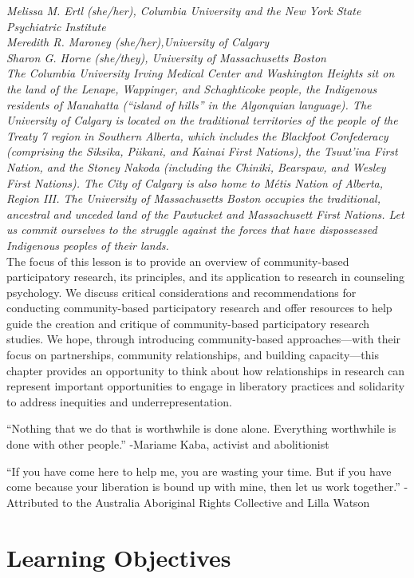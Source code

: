 \documentclass[
  11pt,
]{book}
\begin{document}
\emph{Melissa M. Ertl (she/her), Columbia University and the New York State Psychiatric Institute}\\
\emph{Meredith R. Maroney (she/her),University of Calgary}\\
\emph{Sharon G. Horne (she/they), University of Massachusetts Boston}\\
\emph{The Columbia University Irving Medical Center and Washington Heights sit on the land of the Lenape, Wappinger, and Schaghticoke people, the Indigenous residents of Manahatta (``island of hills'' in the Algonquian language). The University of Calgary is located on the traditional territories of the people of the Treaty 7 region in Southern Alberta, which includes the Blackfoot Confederacy (comprising the Siksika, Piikani, and Kainai First Nations), the Tsuut'ina First Nation, and the Stoney Nakoda (including the Chiniki, Bearspaw, and Wesley First Nations). The City of Calgary is also home to Métis Nation of Alberta, Region III. The University of Massachusetts Boston occupies the traditional, ancestral and unceded land of the Pawtucket and Massachusett First Nations. Let us commit ourselves to the struggle against the forces that have dispossessed Indigenous peoples of their lands.}\\

The focus of this lesson is to provide an overview of community-based participatory research, its principles, and its application to research in counseling psychology. We discuss critical considerations and recommendations for conducting community-based participatory research and offer resources to help guide the creation and critique of community-based participatory research studies. We hope, through introducing community-based approaches---with their focus on partnerships, community relationships, and building capacity---this chapter provides an opportunity to think about how relationships in research can represent important opportunities to engage in liberatory practices and solidarity to address inequities and underrepresentation.

``Nothing that we do that is worthwhile is done alone. Everything worthwhile is done with other people.'' -Mariame Kaba, activist and abolitionist

``If you have come here to help me, you are wasting your time. But if you have come because your liberation is bound up with mine, then let us work together.'' -Attributed to the Australia Aboriginal Rights Collective and Lilla Watson

\section{Learning Objectives}\label{learning-objectives-2}
\end{document}
